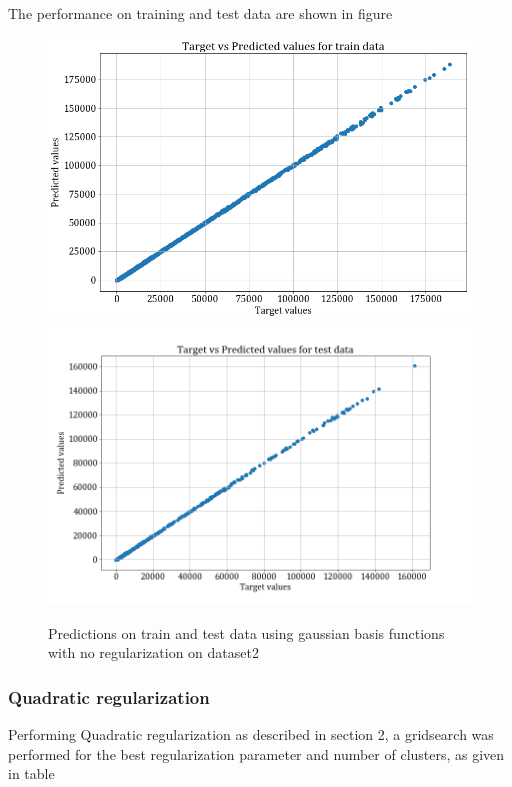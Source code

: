 \documentclass[12pt,a4paper]{article}
\newcommand{\noi}{\noindent}
\begin{document}
\noi
The performance on training and test data are shown in figure 
\begin{figure}[H]
    \centering
    \includegraphics[scale=0.4]{images/train_ds2_noreg.png}
    \includegraphics[scale=0.4]{images/test_ds2_noreg.png}
    \caption{Predictions on train and test data using gaussian basis functions with no regularization on dataset2}
    \label{fig:train_teat_ds2_noreg_gaus}
\end{figure}

\subsubsection{Quadratic regularization}
Performing Quadratic regularization as described in section 2, a gridsearch was performed for the best regularization parameter and number of clusters, as given in table 

\end{document}

